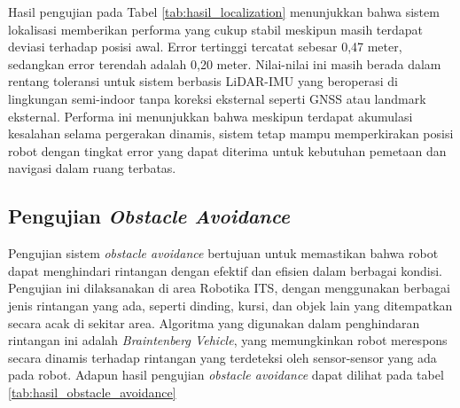 Hasil pengujian pada Tabel \ref{tab:hasil_localization} menunjukkan bahwa sistem lokalisasi memberikan performa yang cukup stabil meskipun masih terdapat deviasi terhadap posisi awal. Error tertinggi tercatat sebesar 0{,}47 meter, sedangkan error terendah adalah 0{,}20 meter. Nilai-nilai ini masih berada dalam rentang toleransi untuk sistem berbasis LiDAR-IMU yang beroperasi di lingkungan semi-indoor tanpa koreksi eksternal seperti GNSS atau landmark eksternal. Performa ini menunjukkan bahwa meskipun terdapat akumulasi kesalahan selama pergerakan dinamis, sistem tetap mampu memperkirakan posisi robot dengan tingkat error yang dapat diterima untuk kebutuhan pemetaan dan navigasi dalam ruang terbatas.

\subsection{Pengujian \emph{Obstacle Avoidance}}
Pengujian sistem \emph{obstacle avoidance} bertujuan untuk memastikan bahwa robot dapat menghindari rintangan dengan efektif dan efisien dalam berbagai kondisi. Pengujian ini dilaksanakan di area Robotika ITS, dengan menggunakan berbagai jenis rintangan yang ada, seperti dinding, kursi, dan objek lain yang ditempatkan secara acak di sekitar area. Algoritma yang digunakan dalam penghindaran rintangan ini adalah \emph{Braintenberg Vehicle}, yang memungkinkan robot merespons secara dinamis terhadap rintangan yang terdeteksi oleh sensor-sensor yang ada pada robot. Adapun hasil pengujian \emph{obstacle avoidance} dapat dilihat pada tabel \ref{tab:hasil_obstacle_avoidance}

